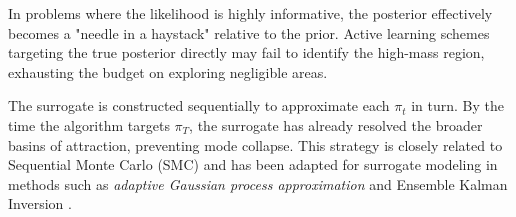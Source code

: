 \documentclass[12pt]{article}
\begin{document}
\citep{wang2018adaptive,adaptiveMultimodal} 


In problems where the likelihood is highly informative, the posterior effectively becomes a "needle in a haystack" relative to the prior. Active learning schemes targeting the true posterior directly may fail to identify the high-mass region, exhausting the budget on exploring negligible areas.

The surrogate is constructed sequentially to approximate each $\pi_t$ in turn. By the time the algorithm targets $\pi_T$, the surrogate has already resolved the broader basins of attraction, preventing mode collapse. This strategy is closely related to Sequential Monte Carlo (SMC) and has been adapted for surrogate modeling in methods such as \textit{adaptive Gaussian process approximation} \citep{wang2018adaptive, adaptiveMultimodal} and Ensemble Kalman Inversion \citep{EKI_review}.
\end{document}
